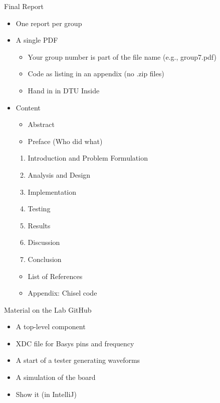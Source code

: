 \begin{frame}[fragile]{Final Report}
\begin{itemize}
\item One report per group
\item A single PDF
\begin{itemize}
\item Your group number is part of the file name (e.g., group7.pdf)
\item Code as listing in an appendix (no .zip files)
\item Hand in in DTU Inside
\end{itemize}
\item Content
\begin{itemize}
\item Abstract
\item Preface (Who did what)
\end{itemize}
\begin{enumerate}
\item Introduction and Problem Formulation
\item Analysis and Design
\item Implementation
\item Testing
\item Results
\item Discussion
\item Conclusion
\end{enumerate}
\begin{itemize}
\item List of References
\item Appendix: Chisel code
\end{itemize}
\end{itemize}
\end{frame}

\begin{frame}[fragile]{Material on the Lab GitHub}
\begin{itemize}
\item A top-level component
\item XDC file for Basys pins and frequency
\item A start of a tester generating waveforms
\item A simulation of the board
\item Show it (in IntelliJ)
\end{itemize}
\end{frame}

